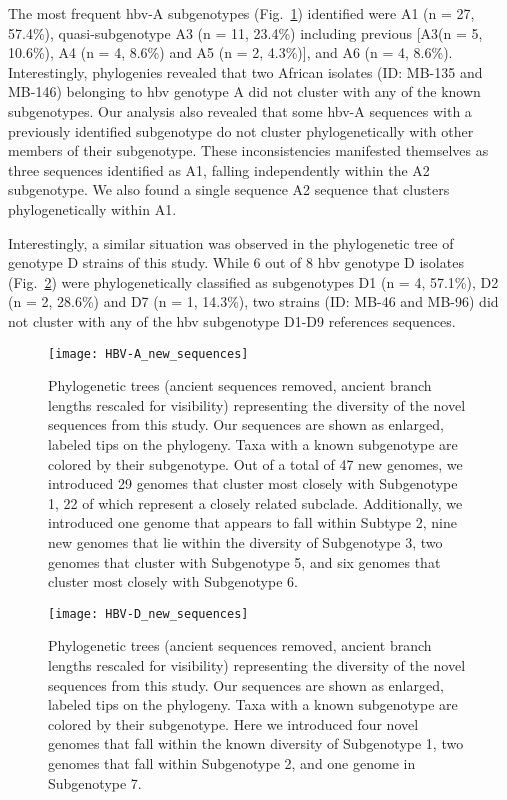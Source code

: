 The most frequent \gls{hbv}-A subgenotypes (Fig.~\ref{fig:HBV-A_new_sequences}) identified were A1 (n = 27, 57.4\%), quasi-subgenotype A3 (n = 11, 23.4\%) including previous [A3(n = 5, 10.6\%), A4 (n = 4, 8.6\%) and A5 (n = 2, 4.3\%)], and A6 (n = 4, 8.6\%).
Interestingly, phylogenies revealed that two African isolates (ID: MB-135 and MB-146) belonging to \gls{hbv} genotype A did not cluster with any of the known subgenotypes.
Our analysis also revealed that some \gls{hbv}-A sequences with a previously identified subgenotype do not cluster phylogenetically with other members of their subgenotype.
These inconsistencies manifested themselves as three sequences identified as A1, falling independently within the A2 subgenotype.
We also found a single sequence A2 sequence that clusters phylogenetically within A1.

Interestingly, a similar situation was observed in the phylogenetic tree of genotype D strains of this study.
While 6 out of 8 \gls{hbv} genotype D isolates (Fig.~\ref{fig:HBV-D_new_sequences}) were phylogenetically classified as subgenotypes D1 (n = 4, 57.1\%), D2 (n = 2, 28.6\%) and D7 (n = 1, 14.3\%), two strains (ID: MB-46 and MB-96) did not cluster with any of the \gls{hbv} subgenotype D1-D9 references sequences.

\begin{figure}[ht]
  \centering
  \medskip
  \texttt{[image: HBV-A\_new\_sequences]}
  \caption[HBV-A New sequences]{Phylogenetic trees (ancient sequences removed, ancient branch lengths rescaled for visibility) representing the diversity of the novel sequences from this study. Our sequences are shown as enlarged, labeled tips on the phylogeny. Taxa with a known subgenotype are colored by their subgenotype. Out of a total of 47 new genomes, we introduced 29 genomes that cluster most closely with Subgenotype 1, 22 of which represent a closely related subclade. Additionally, we introduced one genome that appears to fall within Subtype 2, nine new genomes that lie within the diversity of Subgenotype 3, two genomes that cluster with Subgenotype 5, and six genomes that cluster most closely with Subgenotype 6.}
  \label{fig:HBV-A_new_sequences}
\end{figure}

\begin{figure}[ht]
  \centering
  \medskip
  \texttt{[image: HBV-D\_new\_sequences]}
  \caption[HBV-D New sequences]{Phylogenetic trees (ancient sequences removed, ancient branch lengths rescaled for visibility) representing the diversity of the novel sequences from this study. Our sequences are shown as enlarged, labeled tips on the phylogeny. Taxa with a known subgenotype are colored by their subgenotype. Here we introduced four novel genomes that fall within the known diversity of Subgenotype 1, two genomes that fall within Subgenotype 2, and one genome in Subgenotype 7.}
  \label{fig:HBV-D_new_sequences}
\end{figure}

